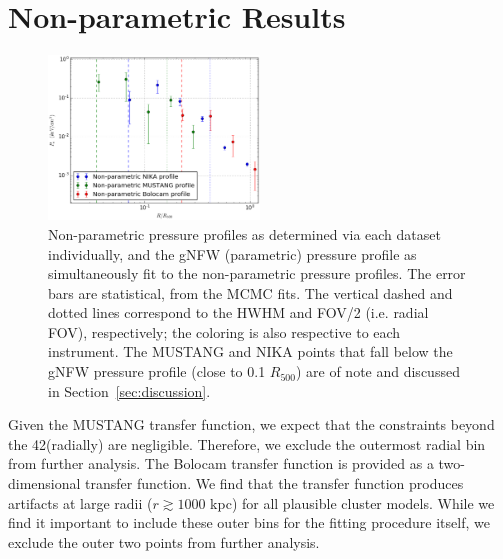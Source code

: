 \documentclass[iop,numberedappendix,apj]{emulateapj}
\begin{document}
\section{Non-parametric Results}
\label{sec:np_res}

\begin{figure}[!h]
  \centering
  \includegraphics[width=0.5\textwidth]{NIKA_ml_deproj_figs/Real_Joint_gNFW_Real_11011111_2500S_500B_100W_non_parametric_pressure.eps}
  \caption{Non-parametric pressure profiles as determined via each dataset individually, and the gNFW (parametric)
    pressure profile as simultaneously fit to the non-parametric pressure profiles. The error bars are statistical,
    from the MCMC fits. The vertical dashed and dotted
    lines correspond to the HWHM and FOV/2 (i.e. radial FOV), respectively; the coloring is also respective to each
    instrument. The MUSTANG and NIKA points that fall below the gNFW pressure profile (close to 0.1 $R_{500}$) are of
    note and discussed in Section~\ref{sec:discussion}.}
  \label{fig:joint_pressure}
\end{figure}

Given the MUSTANG transfer function, we expect that the constraints beyond the 42\asecs (radially) are negligible. Therefore,
we exclude the outermost radial bin from further analysis.
The Bolocam transfer function is provided as a two-dimensional transfer function. We find that the transfer function produces
artifacts at large radii ($r \gtrsim 1000$ kpc) for all plausible cluster models. While we find it important to include these
outer bins for the fitting procedure itself, we exclude the outer two points from further analysis.

\end{document}
